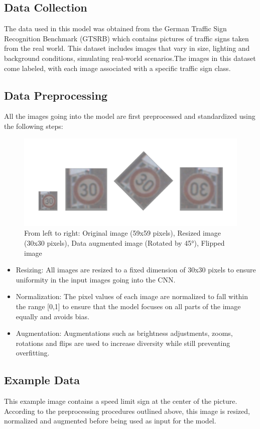 \documentclass{article} %
\begin{document}
\subsection{Data Collection}
The data used in this model was obtained from the German Traffic Sign Recognition Benchmark (GTSRB) which contains pictures of traffic signs taken from the real world. This dataset includes images that vary in size, lighting and background conditions, simulating real-world scenarios.The images in this dataset come labeled, with each image associated with a specific traffic sign class.
\subsection{Data Preprocessing}
All the images going into the model are first preprocessed and standardized using the following steps:
\begin{figure}[h]
    \centering
    \includegraphics[width=0.5\linewidth]{Data Augmentation Images.jpg}
    \caption{
From left to right: Original image (59x59 pixels), Resized image (30x30 pixels), Data augmented image (Rotated by 45°), Flipped image
}
    \label{fig:enter-label}
\end{figure}

\begin{itemize}
    \item Resizing: All images are resized to a fixed dimension of 30x30 pixels to ensure uniformity in the input images going into the CNN.
    \item Normalization: The pixel values of each image are normalized to fall within the range [0,1] to ensure that the model focuses on all parts of the image equally and avoids bias.
    \item Augmentation: Augmentations such as brightness adjustments, zooms, rotations and flips are used to increase diversity while still preventing overfitting.
\end{itemize}

\subsection{Example Data}
This example image contains a speed limit sign at the center of the picture. According to the preprocessing procedures outlined above, this image is resized, normalized and augmented before being used as input for the model.
\end{document}

